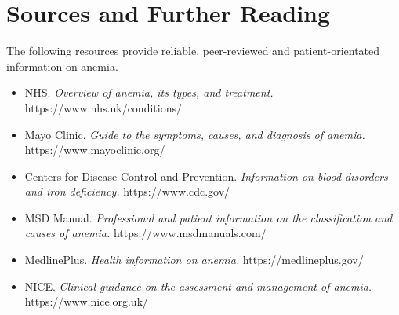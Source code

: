 \section*{Sources and Further Reading}
The following resources provide reliable, peer-reviewed and patient-orientated information on anemia.

\begin{itemize}
    \item NHS. \textit{Overview of anemia, its types, and treatment.} https://www.nhs.uk/conditions/
    \item Mayo Clinic. \textit{Guide to the symptoms, causes, and diagnosis of anemia.} https://www.mayoclinic.org/
    \item Centers for Disease Control and Prevention. \textit{Information on blood disorders and iron deficiency.} https://www.cdc.gov/
    \item MSD Manual. \textit{Professional and patient information on the classification and causes of anemia.} https://www.msdmanuals.com/
    \item MedlinePlus. \textit{Health information on anemia.} https://medlineplus.gov/
    \item NICE. \textit{Clinical guidance on the assessment and management of anemia.} https://www.nice.org.uk/
\end{itemize}
